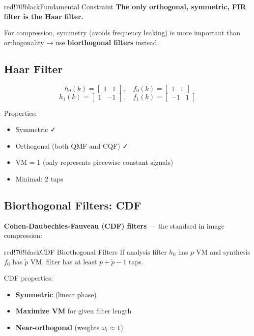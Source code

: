 \begin{calloutbox}{red!70!black}{Fundamental Constraint}
\textbf{The only orthogonal, symmetric, FIR filter is the Haar filter.}

For compression, symmetry (avoids frequency leaking) is more important than orthogonality → use \textbf{biorthogonal filters} instead.
\end{calloutbox}

\subsection{Haar Filter}

\[
h_0(k) = \begin{bmatrix} 1 & 1 \end{bmatrix}, \quad f_0(k) = \begin{bmatrix} 1 & 1 \end{bmatrix}
\]
\[
h_1(k) = \begin{bmatrix} 1 & -1 \end{bmatrix}, \quad f_1(k) = \begin{bmatrix} -1 & 1 \end{bmatrix}
\]

Properties:
\begin{itemize}
\item Symmetric ✓
\item Orthogonal (both QMF and CQF) ✓
\item VM = 1 (only represents piecewise constant signals)
\item Minimal: 2 taps
\end{itemize}
\subsection{Biorthogonal Filters: CDF}

\textbf{Cohen-Daubechies-Fauveau (CDF) filters} — the standard in image compression:

\begin{calloutbox}{red!70!black}{CDF Biorthogonal Filters}
If analysis filter $h_0$ has $p$ VM and synthesis $f_0$ has $\tilde{p}$ VM, filter has at least $p + \tilde{p} - 1$ taps.

CDF properties:
\begin{itemize}
\item \textbf{Symmetric} (linear phase)
\item \textbf{Maximize VM} for given filter length
\item \textbf{Near-orthogonal} (weights $\omega_i \approx 1$)
\end{itemize}
\end{calloutbox}

